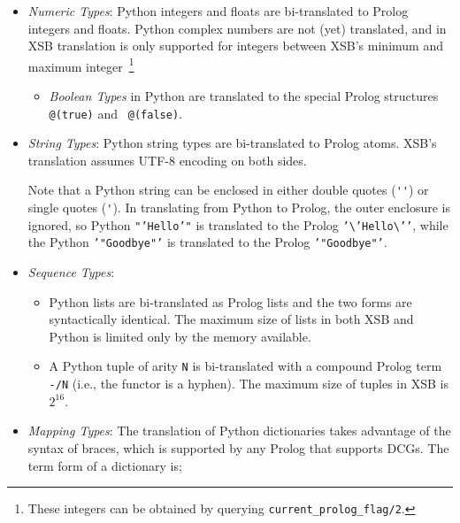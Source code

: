 \begin{itemize}
       \item {\em Numeric Types}: Python integers and floats are
         bi-translated to Prolog integers and floats.  Python complex
         numbers are not (yet) translated, and in XSB translation is only
         supported for integers between XSB's minimum and maximum
         integer~\footnote{These integers can be obtained by querying
         {\tt current\_prolog\_flag/2}.}
         \begin{itemize}
           \item {\em Boolean Types} in Python are translated to the
             special Prolog structures {\tt @(true)} and {\tt
               @(false)}.
         \end{itemize}
       \item {\em String Types}: Python string types are bi-translated
         to Prolog atoms.  XSB's translation assumes UTF-8 encoding on
         both sides.

         Note that a Python string can be enclosed in either double
         quotes (\verb|''|) or single quotes (\verb|'|).  In
         translating from Python to Prolog, the outer enclosure is
         ignored, so Python {\tt "'Hello'"} is translated to the
         Prolog {\tt '\textbackslash{}'Hello\textbackslash{}'{}'},
         while the Python {\tt '"Goodbye"'} is translated to the Prolog
         {\tt '"Goodbye"'}.
       \item {\em Sequence Types}:
         \begin{itemize}
           \item Python lists are bi-translated as Prolog lists and
             the two forms are syntactically identical.  The maximum
             size of lists in both XSB and Python is limited only by
             the memory available.
           \item A Python tuple of arity {\tt N} is bi-translated with
             a compound Prolog term \verb|-/N| (i.e., the functor is a
             hyphen).  The maximum size of tuples in XSB is $2^{16}$.
         \end{itemize}
       \item {\em Mapping Types}: The translation of Python
         dictionaries takes advantage of the syntax of braces, which
         is supported by any Prolog that supports DCGs. The term form
         of a dictionary is;


\end{itemize}
